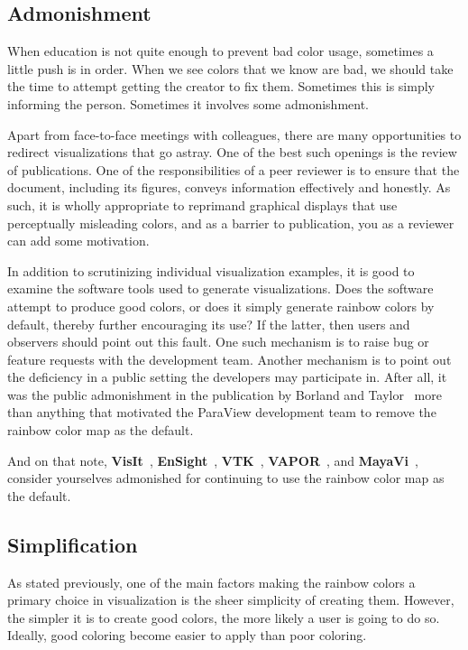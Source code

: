 \documentclass[letterpaper,twocolumn,fleqn]{article}
\newcommand*{\lcite}[1]{~\cite{#1}}
\newcommand*{\scite}[1]{~\cite{#1}}
\begin{document}
\subsection{Admonishment}

\noindent
When education is not quite enough to prevent bad color usage, sometimes a
little push is in order. When we see colors that we know are bad, we should
take the time to attempt getting the creator to fix them. Sometimes this is
simply informing the person. Sometimes it involves some admonishment.

Apart from face-to-face meetings with colleagues, there are many
opportunities to redirect visualizations that go astray. One of the best
such openings is the review of publications. One of the responsibilities of
a peer reviewer is to ensure that the document, including its figures,
conveys information effectively and honestly. As such, it is wholly
appropriate to reprimand graphical displays that use perceptually
misleading colors, and as a barrier to publication, you as a reviewer can
add some motivation.

In addition to scrutinizing individual visualization examples, it is good
to examine the software tools used to generate visualizations. Does the
software attempt to produce good colors, or does it simply generate rainbow
colors by default, thereby further encouraging its use? If the latter, then
users and observers should point out this fault. One such mechanism is to
raise bug or feature requests with the development team. Another mechanism
is to point out the deficiency in a public setting the developers may
participate in. After all, it was the public admonishment in the
publication by Borland and Taylor\scite{Borland2007} more than anything
that motivated the ParaView development team to remove the rainbow color
map as the default.

And on that note, \textbf{VisIt}\lcite{VisIt},
\textbf{EnSight}\lcite{EnSight}, \textbf{VTK}\lcite{VTK},
\textbf{VAPOR}\lcite{VAPOR}, and \textbf{MayaVi}\lcite{MayaVi}, consider
yourselves admonished for continuing to use the rainbow color map as the
default.

\subsection{Simplification}

\noindent
As stated previously, one of the main factors making the rainbow colors a
primary choice in visualization is the sheer simplicity of creating them.
However, the simpler it is to create good colors, the more likely a user is
going to do so. Ideally, good coloring become easier to apply than poor
coloring.
\end{document}
